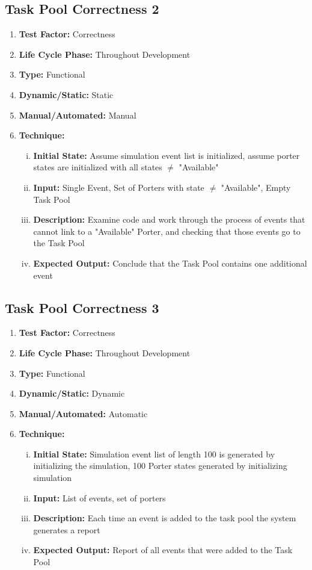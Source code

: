 \documentclass[paper=letter, fontsize=10pt]{scrartcl}
\numberwithin{equation}{section}		%
\numberwithin{figure}{section}			%
\numberwithin{table}{section}				%
\begin{document}
\subsection{Task Pool Correctness 2}
\begin{enumerate}[]
	\item \textbf{Test Factor:} Correctness
	\item \textbf{Life Cycle Phase:} Throughout Development
	\item \textbf{Type:} Functional
	\item \textbf{Dynamic/Static:} Static
	\item \textbf{Manual/Automated:} Manual
	\item \textbf{Technique:}
		\begin{enumerate}[(i)]
			\item \textbf{Initial State:} Assume simulation event list is initialized, assume porter states are initialized with all states $\neq$ "Available"
			\item \textbf{Input:} Single Event, Set of Porters with state $\neq$ "Available", Empty Task Pool
			\item \textbf{Description:} Examine code and work through the process of events that cannot link to a "Available" Porter, and checking that those events go to the Task Pool
			\item \textbf{Expected Output:} Conclude that the Task Pool contains one additional event 
		\end{enumerate}
\end{enumerate}

\subsection{Task Pool Correctness 3}
\begin{enumerate}[]
	\item \textbf{Test Factor:} Correctness
	\item \textbf{Life Cycle Phase:} Throughout Development
	\item \textbf{Type:} Functional
	\item \textbf{Dynamic/Static:} Dynamic
	\item \textbf{Manual/Automated:} Automatic
	\item \textbf{Technique:}
		\begin{enumerate}[(i)]
			\item \textbf{Initial State:} Simulation event list of length 100 is generated by initializing the simulation, 100 Porter states generated by initializing simulation
			\item \textbf{Input:} List of events, set of porters
			\item \textbf{Description:} Each time an event is added to the task pool the system generates a report
			\item \textbf{Expected Output:} Report of all events that were added to the Task Pool
		\end{enumerate}
\end{enumerate}
\end{document}
